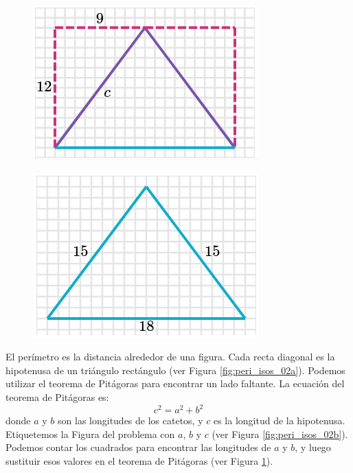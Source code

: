 \begin{solutionbox}{16cm}
\begin{minipage}{0.3\textwidth}
\begin{figure}[H]
        \end{figure}
        \begin{figure}[H]
            \centering
            \includegraphics[width=0.6\linewidth]{../images/peri_isos_02c.png}
            \caption{}
            \label{fig:peri_isos_02c}
        \end{figure}
        \begin{figure}[H]
            \centering
            \includegraphics[width=0.6\linewidth]{../images/peri_isos_02d.png}
            \caption{}
            \label{fig:peri_isos_02d}
        \end{figure}
    \end{minipage}\hfill
    \begin{minipage}{0.65\textwidth}
        El perímetro es la distancia alrededor de una figura.
        Cada recta diagonal es la hipotenusa de un triángulo rectángulo (ver Figura \ref{fig:peri_isos_02a}).
        Podemos utilizar el teorema de Pitágoras para encontrar un lado faltante.
        La ecuación del teorema de Pitágoras es:
        \[c^2=a^2+b^2\]
        donde $a$ y $b$ son las longitudes de los catetos, y $c$ es la longitud de la hipotenusa.
        Etiquetemos la Figura del problema con $a$, $b$ y $c$ (ver Figura \ref{fig:peri_isos_02b}).
        Podemos contar los cuadrados para encontrar las longitudes de $a$ y $b$, y luego sustituir esos valores en el teorema de Pitágoras (ver Figura \ref{fig:peri_isos_02c}).

\end{minipage}
\end{solutionbox}
